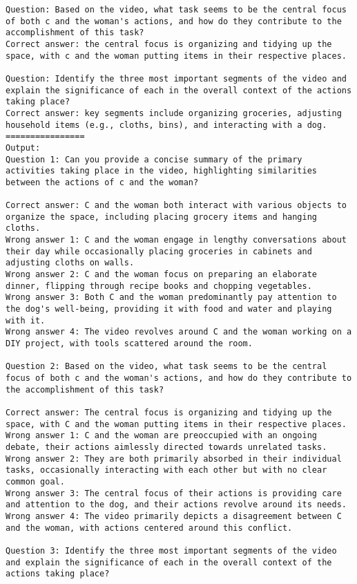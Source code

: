 \begin{lstlisting}
Question: Based on the video, what task seems to be the central focus of both c and the woman's actions, and how do they contribute to the accomplishment of this task?
Correct answer: the central focus is organizing and tidying up the space, with c and the woman putting items in their respective places.

Question: Identify the three most important segments of the video and explain the significance of each in the overall context of the actions taking place?
Correct answer: key segments include organizing groceries, adjusting household items (e.g., cloths, bins), and interacting with a dog.
================
Output:
Question 1: Can you provide a concise summary of the primary activities taking place in the video, highlighting similarities between the actions of c and the woman?

Correct answer: C and the woman both interact with various objects to organize the space, including placing grocery items and hanging cloths.
Wrong answer 1: C and the woman engage in lengthy conversations about their day while occasionally placing groceries in cabinets and adjusting cloths on walls.
Wrong answer 2: C and the woman focus on preparing an elaborate dinner, flipping through recipe books and chopping vegetables.
Wrong answer 3: Both C and the woman predominantly pay attention to the dog's well-being, providing it with food and water and playing with it.
Wrong answer 4: The video revolves around C and the woman working on a DIY project, with tools scattered around the room.

Question 2: Based on the video, what task seems to be the central focus of both c and the woman's actions, and how do they contribute to the accomplishment of this task?

Correct answer: The central focus is organizing and tidying up the space, with C and the woman putting items in their respective places.
Wrong answer 1: C and the woman are preoccupied with an ongoing debate, their actions aimlessly directed towards unrelated tasks.
Wrong answer 2: They are both primarily absorbed in their individual tasks, occasionally interacting with each other but with no clear common goal.
Wrong answer 3: The central focus of their actions is providing care and attention to the dog, and their actions revolve around its needs.
Wrong answer 4: The video primarily depicts a disagreement between C and the woman, with actions centered around this conflict.

Question 3: Identify the three most important segments of the video and explain the significance of each in the overall context of the actions taking place?


\end{lstlisting}

